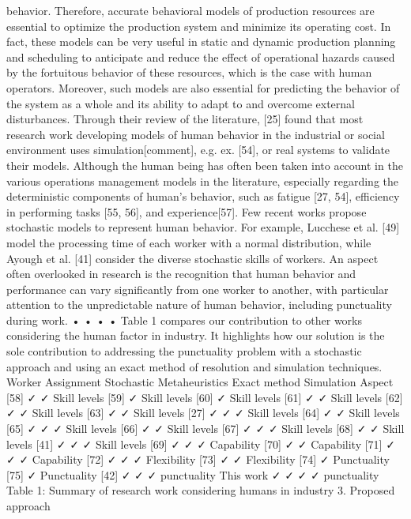 behavior.
Therefore, accurate behavioral models of production resources are essential to optimize the production system and minimize its operating cost. In fact, these models can be very useful in static and dynamic production planning and scheduling to anticipate and reduce the effect of operational hazards caused by the fortuitous behavior of these resources, which is the case with human operators. Moreover, such models are also essential for predicting the behavior of the system as a whole and its ability to adapt to and overcome external disturbances.
Through their review of the literature, [25] found that most research work developing models of human behavior in the industrial or social environment uses simulation[comment], e.g. ex. [54], or real systems to validate their models. Although the human being has often been taken into account in the various operations management models in the literature, especially regarding the deterministic components of human’s behavior, such as fatigue [27, 54], efficiency in performing tasks [55, 56], and experience[57]. Few recent works propose stochastic models to represent human behavior. For example, Lucchese et al. [49] model the processing time of each worker with a normal distribution, while Ayough et al. [41] consider the diverse stochastic skills of workers. An aspect often overlooked in research is the recognition that human behavior and performance can vary significantly from one worker to another, with particular attention to the unpredictable nature of human behavior, including punctuality during work.
•
•
•
•
Table 1 compares our contribution to other works considering the human factor in industry. It highlights how our solution is the sole contribution to addressing the punctuality problem with a stochastic approach and using an exact method of resolution and simulation techniques.
	Worker Assignment	Stochastic	Metaheuristics	Exact method	Simulation	Aspect
[58]	✓			✓		Skill levels
[59]	✓					Skill levels
[60]					✓	Skill levels
[61]	✓		✓			Skill levels
[62]	✓		✓			Skill levels
[63]	✓		✓			Skill levels
[27]	✓		✓		✓	Skill levels
[64]	✓			✓		Skill levels
[65]	✓		✓	✓		Skill levels
[66]	✓			✓		Skill levels
[67]	✓		✓	✓		Skill levels
[68]	✓		✓			Skill levels
[41]	✓	✓		✓		Skill levels
[69]	✓		✓	✓		Capability
[70]	✓			✓		Capability
[71]	✓		✓	✓		Capability
[72]	✓		✓	✓		Flexibility
[73]	✓			✓		Flexibility
[74]		✓				Punctuality
[75]		✓				Punctuality
[42]	✓	✓			✓	punctuality
This work	✓	✓		✓	✓	punctuality
Table 1: Summary of research work considering humans in industry
3.	Proposed approach

